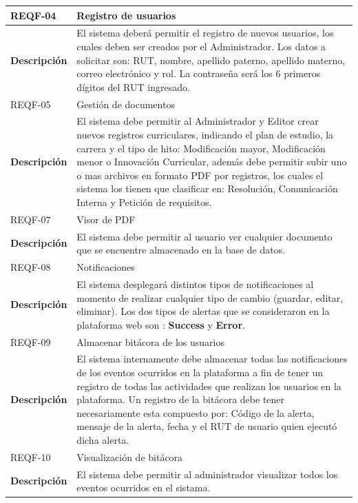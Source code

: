 \begin{longtable}{l |p{11cm}}
		\rowcolor{LightBlue2} REQF-04 & Registro de usuarios\\ \hline
		\textbf{Descripción} & El sistema deberá permitir el registro de nuevos usuarios, los cuales deben ser creados por el Administrador. Los datos a solicitar son: RUT, nombre, apellido paterno, apellido materno, correo electrónico y rol. La contraseña será los 6 primeros dígitos del  RUT ingresado.\\ \hline
		
		\rowcolor{LightBlue2} REQF-05 & Gestión de documentos\\  \hline
		\textbf{Descripción} & El sistema debe permitir al Administrador y Editor crear nuevos registros curriculares, indicando el plan de estudio, la carrera y el tipo de hito: Modificación mayor, Modificación menor o Innovación Curricular, además  debe permitir subir uno o mas archivos en formato PDF por registros, los cuales el sistema los  tienen que clasificar en: Resolución, Comunicación Interna y Petición de requisitos.\\  \hline
		
		\rowcolor{LightBlue2} REQF-07 & Visor de PDF\\  \hline
		\textbf{Descripción} & El sistema debe permitir al usuario ver  cualquier documento que se encuentre almacenado en la base de datos.\\  \hline \hline
		
		
		\rowcolor{LightBlue2} REQF-08 & Notificaciones\\  \hline
		\textbf{Descripción} & El sistema desplegará distintos tipos de notificaciones al momento de realizar cualquier tipo de cambio (guardar, editar, eliminar). Los dos tipos de alertas que se consideraron en la plataforma web son : \textbf{Success} y \textbf{Error}. \\  \hline \hline
		
		\rowcolor{LightBlue2} REQF-09 & Almacenar bitácora de los usuarios\\  \hline
		\textbf{Descripción} & El sistema internamente debe almacenar todas las notificaciones de los eventos ocurridos en la plataforma a fin de tener un registro de  todas  las actividades  que realizan los usuarios en la plataforma. Un registro de la bitácora debe tener necesariamente esta compuesto por: Código de la alerta, mensaje de la alerta, fecha y el RUT de usuario quien ejecutó dicha alerta.\\  \hline
		
		\rowcolor{LightBlue2} REQF-10 & Visualización de bitácora\\  \hline
		\textbf{Descripción} & El sistema debe permitir al administrador visualizar todos los eventos ocurridos en el sistama.\\ 
	
	\end{longtable}


